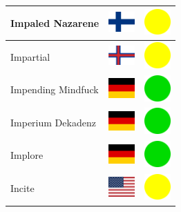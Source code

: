 \documentclass[12pt, a4paper, twoside]{report}
\begin{document}
\begin{center}
\begin{longtable}{|p{5cm}|p{2cm}|p{2cm}|}
Impaled Nazarene & \includegraphics[width=1cm]{4x3/fi} & \includegraphics[width=1cm]{likes/m} \\ \hline
Impartial & \includegraphics[width=1cm]{4x3/fo} & \includegraphics[width=1cm]{likes/m} \\ \hline
Impending Mindfuck & \includegraphics[width=1cm]{4x3/de} & \includegraphics[width=1cm]{likes/y} \\ \hline
Imperium Dekadenz & \includegraphics[width=1cm]{4x3/de} & \includegraphics[width=1cm]{likes/y} \\ \hline
Implore & \includegraphics[width=1cm]{4x3/de} & \includegraphics[width=1cm]{likes/y} \\ \hline
Incite & \includegraphics[width=1cm]{4x3/us} & \includegraphics[width=1cm]{likes/m} \\ \hline

\end{longtable}
\end{center}
\end{document}
